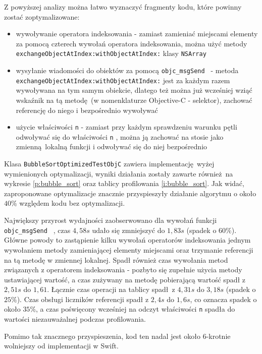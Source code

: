 \documentclass[mgr, shortabstract]{iithesis}
\newcommand{\objcinline}[1]{
    \texttt{#1}
}
\begin{document}
Z powyższej analizy można łatwo wyznaczyć fragmenty kodu, które powinny zostać zoptymalizowane:

\begin{itemize}
    \item wywoływanie operatora indeksowania - zamiast zamieniać miejscami elementy za pomocą czterech wywołań operatora indeksowania, można użyć metody \objcinline{exchangeObjectAtIndex:withObjectAtIndex:} klasy \objcinline{NSArray}
    \item wysyłanie wiadomości do obiektów za pomocą \objcinline{objc_msgSend } - metoda \objcinline{exchangeObjectAtIndex:withObjectAtIndex:} jest za każdym razem wywoływana na tym samym obiekcie, dlatego też można już wcześniej wziąć wskaźnik na tą metodę (w nomenklaturze Objective-C - selektor), zachować referencję do niego i bezpośrednio wywoływać
    \item użycie właściwości \objcinline{n} - zamiast przy każdym sprawdzeniu warunku pętli odwoływać się do właściwości \objcinline{n}, można ją zachować na stosie jako zmienną lokalną funkcji i odwoływać się do niej bezpośrednio
\end{itemize}

Klasa \objcinline{BubbleSortOptimizedTestObjC} zawiera implementację wyżej wymienionych optymalizacji, wyniki działania zostały zawarte również na wykresie \ref{p:bubble_sort} oraz tablicy profilowania \ref{i:bubble_sort}. Jak widać, zaproponowane optymalizacje znacznie przyspieszyły działanie algorytmu o około $40\%$ względem kodu bez optymalizacji.

Największy przyrost wydajności zaobserwowano dla wywołań funkcji \objcinline{objc_msgSend }, czas $4,58s$ udało się zmniejszyć do $1,83s$ (spadek o $60\%$). Główne powody to zastąpienie kilku wywołań operatorów indeksowania jednym wywołaniem metody zamieniającej elementy miejscami oraz trzymanie referencji na tą metodę w zmiennej lokalnej. Spadł również czas wywołania metod związanych z operatorem indeksowania - pozbyto się zupełnie użycia metody ustawiającej wartość, a czas zużywany na metodę pobierającą wartość spadł z $2,51s$ do $1,61$. Łącznie czas operacji na tablicy spadł z $4,31s$ do $3,18s$ (spadek o $25\%$). Czas obsługi liczników referencji spadł z $2,4s$ do $1,6s$, co oznacza spadek o około $35\%$, a czas poświęcony wcześniej na odczyt właściwości \objcinline{n} spadła do wartości niezauważalnej podczas profilowania.

Pomimo tak znacznego przyspieszenia, kod ten nadal jest około 6-krotnie wolniejszy od implementacji w Swift.
\end{document}
